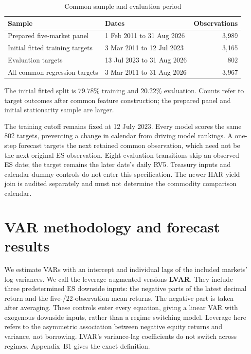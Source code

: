 \documentclass[11pt,letterpaper]{article}
\begin{document}
\begin{table}[H]
\centering\caption{Common sample and evaluation period}\label{tab:sample}
\small\begin{tabular}{p{2.5in}p{2.5in}r}\toprule
Sample & Dates & Observations\\\midrule
Prepared five-market panel & 1 Feb 2011 to 31 Aug 2026 & 3,989\\
Initial fitted training targets & 3 Mar 2011 to 12 Jul 2023 & 3,165\\
Evaluation targets & 13 Jul 2023 to 31 Aug 2026 & 802\\
All common regression targets & 3 Mar 2011 to 31 Aug 2026 & 3,967\\\bottomrule
\end{tabular}\end{table}
{\footnotesize The initial fitted split is 79.78\% training and 20.22\% evaluation.
Counts refer to target outcomes after common feature construction; the prepared panel
and initial stationarity sample are larger.\par}

The training cutoff remains fixed at 12 July 2023. Every model scores the same 802
targets, preventing a change in calendar from driving model rankings. A one-step
forecast targets the next retained common observation, which need not be the next
original ES observation. Eight evaluation transitions skip an observed ES date;
the target remains the later date's daily RV5. Treasury inputs and calendar dummy
controls do not enter this specification. The newer HAR yield join is audited
separately and must not determine the commodity comparison calendar.

\clearpage
\section*{VAR methodology and forecast results}
We estimate VARs with an intercept and individual lags of the included markets'
log variances. We call the leverage-augmented versions \textbf{LVAR}. They include
three predetermined ES downside
inputs: the negative parts of the latest decimal return and the five-/22-observation
mean returns. The negative part is taken after averaging. These controls enter every
equation, giving a linear VAR with exogenous downside inputs, rather than a regime
switching model. Leverage here refers to the asymmetric association between negative
equity returns and variance, not borrowing. LVAR's variance-lag coefficients do not
switch across regimes. Appendix~B1 gives the exact definition.
\end{document}

